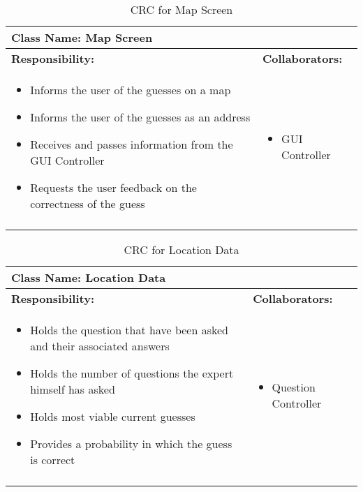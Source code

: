 \documentclass[titlepage]{article}
\begin{document}
	\begin{longtable}{| p{} | p{} |}
			\hline
			 \multicolumn{2}{|l|}{\textbf{Class Name: Map Screen}} \\
			\hline
			\textbf{Responsibility:} & \textbf{Collaborators:} \\
			\hline
				\begin{itemize}
					\item Informs the user of the guesses on a map
					\item Informs the user of the guesses as an address
					\item Receives and passes information from the GUI Controller
					\item Requests the user feedback on the correctness of the guess
				\end{itemize} & 
				\begin{itemize}
					\item GUI Controller
				\end{itemize} 
				\\
			\hline
		\caption{CRC for Map Screen}
	\end{longtable}
	
	\begin{longtable}{| p{} | p{} |}
			\hline
			 \multicolumn{2}{|l|}{\textbf{Class Name: Location Data}} \\
			\hline
			\textbf{Responsibility:} & \textbf{Collaborators:} \\
			\hline
				\begin{itemize}
					\item Holds the question that have been asked and their associated answers
					\item Holds the number of questions the expert himself has asked
					\item Holds most viable current guesses
					\item Provides a probability in which the guess is correct
				\end{itemize} & 
				\begin{itemize}
					\item Question Controller
				\end{itemize} 
				\\
			\hline
		\caption{CRC for Location Data}
	\end{longtable}
	
\end{document}
